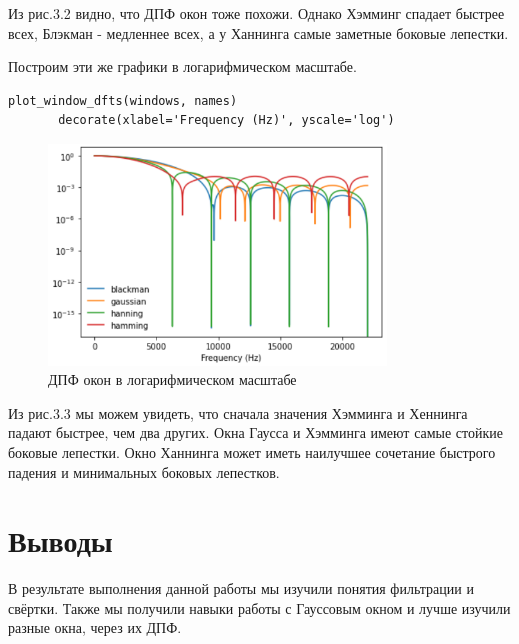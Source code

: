 \documentclass[a4paper,12pt]{report}
\begin{document}
       Из рис.3.2 видно, что ДПФ окон тоже похожи. Однако Хэмминг спадает быстрее всех, Блэкман - медленнее всех, а у Ханнинга самые заметные боковые лепестки.
       
       Построим эти же графики в логарифмическом масштабе.
\begin{lstlisting}[caption=Построение ДПФ в логарифмическом масштабе]
       plot_window_dfts(windows, names)
       decorate(xlabel='Frequency (Hz)', yscale='log')
\end{lstlisting}
\begin{figure}[H]
        \centering
        \includegraphics[width=0.8\textwidth]{fig3-3.PNG}
        \caption{ДПФ окон в логарифмическом масштабе}
        \label{fig:fig3-3}
\end{figure}  

    Из рис.3.3 мы можем увидеть, что сначала значения Хэмминга и Хеннинга падают быстрее, чем два других. Окна Гаусса и Хэмминга имеют самые стойкие боковые лепестки. Окно Ханнинга может иметь наилучшее сочетание быстрого падения и минимальных боковых лепестков.     
\chapter{Выводы}
    В результате выполнения данной работы мы изучили понятия фильтрации и свёртки. Также мы получили навыки работы с Гауссовым окном и лучше изучили разные окна, через их ДПФ.
\end{document}

